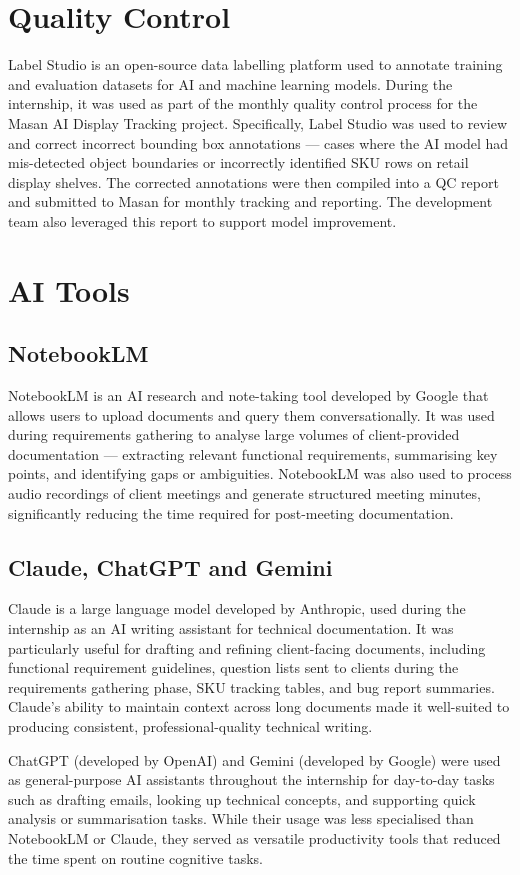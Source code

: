 \section{Quality Control}

Label Studio is an open-source data labelling platform used to annotate training and evaluation datasets for AI and machine learning models. During the internship, it was used as part of the monthly quality control process for the Masan AI Display Tracking project. Specifically, Label Studio was used to review and correct incorrect bounding box annotations — cases where the AI model had mis-detected object boundaries or incorrectly identified SKU rows on retail display shelves. The corrected annotations were then compiled into a QC report and submitted to Masan for monthly tracking and reporting. The development team also leveraged this report to support model improvement.

\section{AI Tools}

\subsection{NotebookLM}

NotebookLM is an AI research and note-taking tool developed by Google that allows users to upload documents and query them conversationally. It was used during requirements gathering to analyse large volumes of client-provided documentation — extracting relevant functional requirements, summarising key points, and identifying gaps or ambiguities. NotebookLM was also used to process audio recordings of client meetings and generate structured meeting minutes, significantly reducing the time required for post-meeting documentation.

\subsection{Claude, ChatGPT and Gemini}

Claude is a large language model developed by Anthropic, used during the internship as an AI writing assistant for technical documentation. It was particularly useful for drafting and refining client-facing documents, including functional requirement guidelines, question lists sent to clients during the requirements gathering phase, SKU tracking tables, and bug report summaries. Claude's ability to maintain context across long documents made it well-suited to producing consistent, professional-quality technical writing.

ChatGPT (developed by OpenAI) and Gemini (developed by Google) were used as general-purpose AI assistants throughout the internship for day-to-day tasks such as drafting emails, looking up technical concepts, and supporting quick analysis or summarisation tasks. While their usage was less specialised than NotebookLM or Claude, they served as versatile productivity tools that reduced the time spent on routine cognitive tasks.
